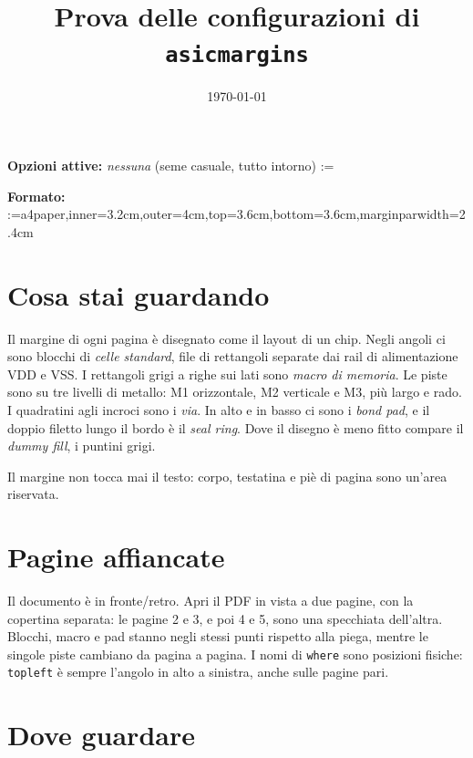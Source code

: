 \documentclass[11pt,twoside]{article}   %
\title{Prova delle configurazioni di \texttt{asicmargins}}
\author{}
\date{\today}
\makeatletter
\def\formato{a4paper,inner=3.2cm,outer=4cm,top=3.6cm,bottom=3.6cm,marginparwidth=2.4cm}
\def\opzioni{}
\newcommand{\mostra}[1]{\def\sep{}%
  \@for\voce:=#1\do{\sep\texttt{\expandafter\detokenize\expandafter{\voce}}\def\sep{,\ }}}
\def\vuoto{}
\makeatother
\begin{document}
\maketitle

{\raggedright
\noindent\textbf{Opzioni attive:}
\ifx\opzioni\vuoto\emph{nessuna} (seme casuale, tutto intorno)\else\mostra{\opzioni}\fi\par
\smallskip
\noindent\textbf{Formato:} \mostra{\formato}\par}

\section{Cosa stai guardando}

Il margine di ogni pagina è disegnato come il layout di un chip. Negli angoli ci
sono blocchi di \emph{celle standard}, file di rettangoli separate dai rail di
alimentazione VDD e VSS. I rettangoli grigi a righe sui lati sono \emph{macro di
memoria}. Le piste sono su tre livelli di metallo: M1 orizzontale, M2 verticale
e M3, più largo e rado. I quadratini agli incroci sono i \emph{via}. In alto e in
basso ci sono i \emph{bond pad}, e il doppio filetto lungo il bordo è il
\emph{seal ring}. Dove il disegno è meno fitto compare il \emph{dummy fill},
i puntini grigi.

Il margine non tocca mai il testo: corpo, testatina e piè di pagina sono un'area
riservata.

\lipsum[1-3]

\section{Pagine affiancate}

Il documento è in fronte/retro. Apri il PDF in vista a due pagine, con la
copertina separata: le pagine 2 e 3, e poi 4 e 5, sono una specchiata dell'altra.
Blocchi, macro e pad stanno negli stessi punti rispetto alla piega, mentre le
singole piste cambiano da pagina a pagina. I nomi di \texttt{where} sono
posizioni fisiche: \texttt{topleft} è sempre l'angolo in alto a sinistra, anche
sulle pagine pari.

\lipsum[4-9]

\section{Dove guardare}
\end{document}

